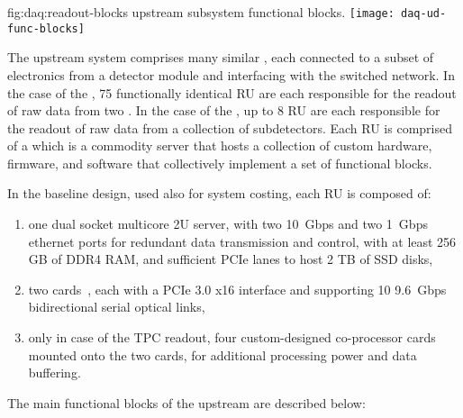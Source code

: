 \begin{dunefigure}{fig:daq:readout-blocks}{ upstream
     subsystem functional blocks.}
  \texttt{[image: daq-ud-func-blocks]}
\end{dunefigure}

The upstream  system comprises many similar , each
connected to a subset of electronics from a detector module and
interfacing with the  switched network. In the case of the
, 75 functionally identical RU are each responsible for the readout of raw data from two
. In the case of the , up to 8 RU are each responsible for the
readout of raw data from a collection of  subdetectors. 
Each RU is comprised of a  which is a commodity server that hosts a
collection of custom hardware, 
firmware, and software that collectively implement a set of functional blocks.

In the baseline design, used also for system costing, each RU is composed of:
\begin{enumerate}
\item one dual socket multicore 2U server, with two \SI{10}{Gbps} and two \SI{1}{Gbps} ethernet ports for redundant data transmission and control, with at least 256 GB of DDR4 RAM, and sufficient PCIe lanes to host 2 TB of SSD disks,
\item two  cards~\cite{atlas-felix}, each with a PCIe 3.0 x16 interface and supporting 10 \SI{9.6}{Gbps} bidirectional serial optical links,
\item only in case of the TPC readout, four custom-designed co-processor cards mounted onto the two  cards, for additional processing power and data buffering.

\end{enumerate}

The main functional blocks of the upstream  are described below:

